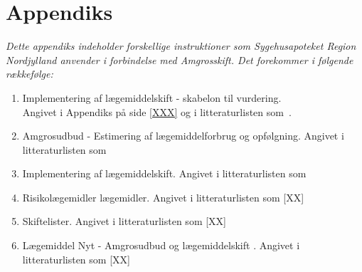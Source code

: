 \chapter{Appendiks} \label{cha:AppD}
\textit{Dette appendiks indeholder forskellige instruktioner som Sygehusapoteket Region Nordjylland anvender i forbindelse med Amgrosskift. Det forekommer i følgende rækkefølge:}

\begin{enumerate}
\item Implementering af lægemiddelskift - skabelon til vurdering. 
\\Angivet i Appendiks på side \ref{XXX} og i litteraturlisten som~\citep{Sygehusapoteket2017}.  \label{item:ATC-ansvarlig}
\item Amgrosudbud - Estimering af lægemiddelforbrug og opfølgning. Angivet i litteraturlisten som~\citep{Sygehusapoteket2017a}
\item Implementering af lægemiddelskift. Angivet i litteraturlisten som~\citep{Sygehusapoteket2017b}
\item Risikolægemidler lægemidler. \label{item:Risikolaegemidler} Angivet i litteraturlisten som [XX]
\item Skiftelister. Angivet i litteraturlisten som [XX] \label{item:Skiftelister}
\item Lægemiddel Nyt - Amgrosudbud og lægemiddelskift \label{item:Laegemiddelnyt}. Angivet i litteraturlisten som [XX] 
\end{enumerate}

 \label{app:1}




